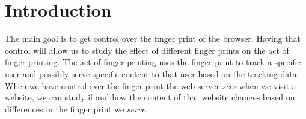 \section{Introduction}

The main goal is to get control over the finger print of the browser.
Having that control will allow us
to study the effect of different finger prints
on the act of finger printing.
The act of finger printing uses the finger print
to track a specific user
and possibly serve specific content to that user
based on the tracking data.
When we have control over the finger print the web server \emph{sees}
when we visit a website,
we can study if and how the content of that website changes
based on differences in the finger print we \emph{serve}.
